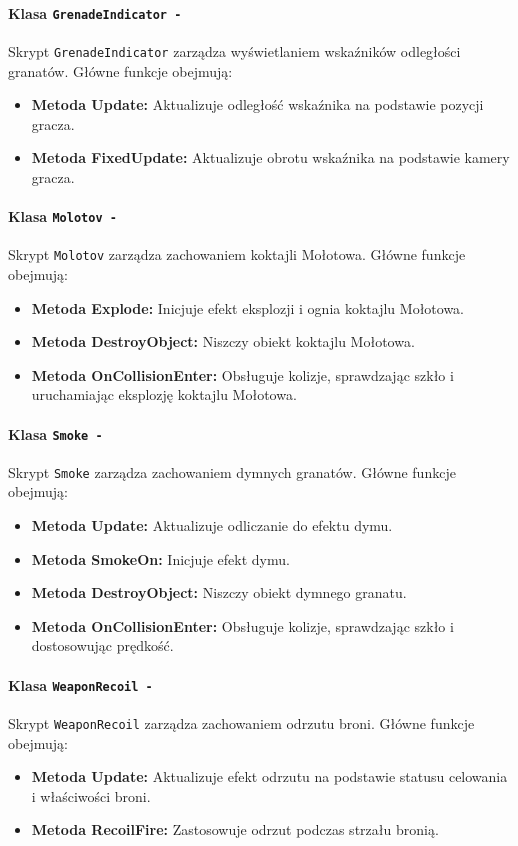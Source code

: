 \paragraph{Klasa \texttt{GrenadeIndicator -}}
Skrypt \texttt{GrenadeIndicator} zarządza wyświetlaniem wskaźników odległości granatów. Główne funkcje obejmują:
\begin{itemize}
  \item \textbf{Metoda Update:} Aktualizuje odległość wskaźnika na podstawie pozycji gracza.
  \item \textbf{Metoda FixedUpdate:} Aktualizuje obrotu wskaźnika na podstawie kamery gracza.
\end{itemize}

\paragraph{Klasa \texttt{Molotov -}}
Skrypt \texttt{Molotov} zarządza zachowaniem koktajli Mołotowa. Główne funkcje obejmują:
\begin{itemize}
  \item \textbf{Metoda Explode:} Inicjuje efekt eksplozji i ognia koktajlu Mołotowa.
  \item \textbf{Metoda DestroyObject:} Niszczy obiekt koktajlu Mołotowa.
  \item \textbf{Metoda OnCollisionEnter:} Obsługuje kolizje, sprawdzając szkło i uruchamiając eksplozję koktajlu Mołotowa.
\end{itemize}

\paragraph{Klasa \texttt{Smoke -}}
Skrypt \texttt{Smoke} zarządza zachowaniem dymnych granatów. Główne funkcje obejmują:
\begin{itemize}
  \item \textbf{Metoda Update:} Aktualizuje odliczanie do efektu dymu.
  \item \textbf{Metoda SmokeOn:} Inicjuje efekt dymu.
  \item \textbf{Metoda DestroyObject:} Niszczy obiekt dymnego granatu.
  \item \textbf{Metoda OnCollisionEnter:} Obsługuje kolizje, sprawdzając szkło i dostosowując prędkość.
\end{itemize}

\paragraph{Klasa \texttt{WeaponRecoil -}}
Skrypt \texttt{WeaponRecoil} zarządza zachowaniem odrzutu broni. Główne funkcje obejmują:
\begin{itemize}
  \item \textbf{Metoda Update:} Aktualizuje efekt odrzutu na podstawie statusu celowania i właściwości broni.
  \item \textbf{Metoda RecoilFire:} Zastosowuje odrzut podczas strzału bronią.
\end{itemize}

